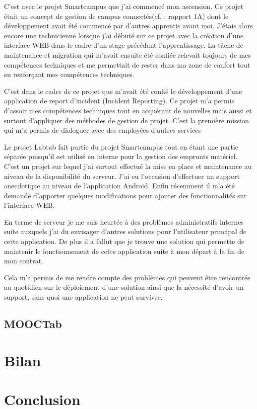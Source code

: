 \documentclass[french,12pt,a4paper,titlepage,openright,openbib]{report}
\begin{document}
C'est avec le projet Smartcampus que j'ai commencé mon ascension. Ce projet était un concept de gestion de campus connectés(cf. : rapport 1A) dont le développement avait été commencé par d'autres apprentis avant moi. J'étais alors encore une technicienne lorsque j'ai débuté sur ce projet avec la création d'une interface WEB dans le cadre d'un stage précédant l'apprentissage.
La tâche de maintenance et migration qui m'avait ensuite été confiée relevait toujours de mes compétences techniques et me permettait de rester dans ma zone de confort tout en renforçant mes compétences techniques.

C'est dans le cadre de ce projet que m'avait été confié le développement d'une application de report d'incident (Incident Reporting). Ce projet m'a permis d'assoir mes compétences techniques tout en acquérant de nouvelles mais aussi et surtout d'appliquer des méthodes de gestion de projet. C'est la première mission qui m'a permis de dialoguer avec des employé\textperiodcentered e\textperiodcentered s d'autres services 

Le projet Labtab fait partie du projet Smartcampus tout en étant une partie séparée puisqu'il est utilisé en interne pour la gestion des emprunts matériel. C'est un projet sur lequel j'ai surtout effectué la mise en place et maintenance au niveau de la disponibilité du serveur.
J'ai eu l'occasion d'effectuer un support anecdotique au niveau de l'application Android. Enfin récemment il m'a été demandé d'apporter quelques modifications pour ajouter des fonctionnalités sur l'interface WEB.

En terme de serveur je me suis heurtée à des problèmes administratifs internes suite auxquels j'ai du envisager d'autres solutions pour l'utilisateur principal de cette application. De plus il a fallut que je trouve une solution qui permette de maintenir le fonctionnement de cette application suite à mon départ à la fin de mon contrat.

Cela m'a permis de me rendre compte des problèmes qui peuvent être rencontrés au quotidien sur le déploiement d'une solution ainsi que la nécessité d'avoir un support, sans quoi une application ne peut survivre.


\section{MOOCTab}

\chapter{Bilan}

\chapter{Conclusion}

\printglossary[title={Glossaire}]

{}

	
\end{document}
